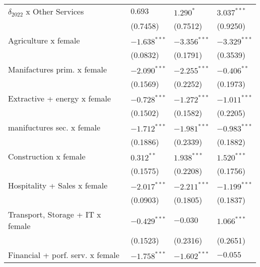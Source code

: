 \begin{tabular}{llll}
$\delta_{2022}$ x Other Services                   &            $0.693$ &          $1.290^*$ &      $3.037^{***}$ \\
                                                   &           (0.7458) &           (0.7512) &           (0.9250) \\
Agriculture x female                               &     $-1.638^{***}$ &     $-3.356^{***}$ &     $-3.329^{***}$ \\
                                                   &           (0.0832) &           (0.1791) &           (0.3539) \\
Manifactures prim. x female                        &     $-2.090^{***}$ &     $-2.255^{***}$ &      $-0.406^{**}$ \\
                                                   &           (0.1569) &           (0.2252) &           (0.1973) \\
Extractive + energy x female                       &     $-0.728^{***}$ &     $-1.272^{***}$ &     $-1.011^{***}$ \\
                                                   &           (0.1502) &           (0.1582) &           (0.2205) \\
manifuctures sec. x female                         &     $-1.712^{***}$ &     $-1.981^{***}$ &     $-0.983^{***}$ \\
                                                   &           (0.1886) &           (0.2339) &           (0.1882) \\
Construction x female                              &       $0.312^{**}$ &      $1.938^{***}$ &      $1.520^{***}$ \\
                                                   &           (0.1575) &           (0.2208) &           (0.1756) \\
Hospitality + Sales x female                       &     $-2.017^{***}$ &     $-2.211^{***}$ &     $-1.199^{***}$ \\
                                                   &           (0.0903) &           (0.1805) &           (0.1837) \\
Transport, Storage + IT x female                   &     $-0.429^{***}$ &           $-0.030$ &      $1.066^{***}$ \\
                                                   &           (0.1523) &           (0.2316) &           (0.2651) \\
Financial + porf. serv. x female                   &     $-1.758^{***}$ &     $-1.602^{***}$ &           $-0.055$ \\

\end{tabular}

